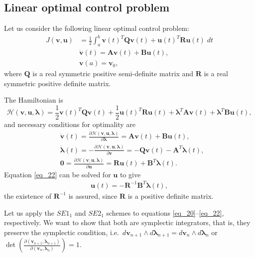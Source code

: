 \documentclass[a4paper, 10pt]{article}
\newcommand{\SEoo}{SE1_1}
\newcommand{\SEto}{SE2_1}
\begin{document}
\subsection{Linear optimal control problem}
Let us consider the following linear optimal control problem:
\begin{equation}
    \label{eq_18}
\begin{aligned}
    J(\bm{v},\bm{u}) & = \frac{1}{2} \int_{a}^b \bm{v}(t)^{T} \bm{Q} \bm{v}(t) + \bm{u}(t)^{T} \bm{R} \bm{u}(t)\; dt \\
    & \dot{\bm{v}}(t) = \bm{A} \bm{v}(t) + \bm{B}\bm{u}(t), \\
    & \bm{v}(a) = \bm{v}_{0},
\end{aligned}
\end{equation}
where $\bm{Q}$ is a real symmetric positive semi-definite matrix and $\bm{R}$ is a real symmetric positive definite matrix.

The Hamiltonian is
\begin{equation}\label{eq_19}
    \mathcal{H}(\bm{v},\bm{u},\bm{\lambda}) =  \frac{1}{2} \bm{v}(t)^{T} \bm{Q} \bm{v}(t) + \frac{1}{2} \bm{u}(t)^{T} \bm{R} \bm{u}(t) + \bm{\lambda}^{T} \bm{A}\bm{v}(t) + \bm{\lambda}^{T} \bm{B}\bm{u}(t),
\end{equation}
and necessary conditions for optimality are
\begin{align}
    & \dot{\bm{v}}(t) = \frac{\partial \mathcal{H}(\bm{v},\bm{u},\bm{\lambda})}{\partial\bm{\lambda}}  = \bm{A} \bm{v}(t) + \bm{B}\bm{u}(t), \label{eq_20} \\
    & \dot{\bm{\lambda}}(t) =  -\frac{\partial \mathcal{H}(\bm{v},\bm{u},\bm{\lambda})}{\partial \bm{v}} = -\bm{Q}\bm{v}(t) - \bm{A}^{T}\bm{\lambda}(t), \label{eq_21} \\
    & \bm{0} =  \frac{\partial \mathcal{H}(\bm{v},\bm{u},\bm{\lambda})}{\partial \bm{u}} = \bm{R}\bm{u}(t) + \bm{B}^{T}\bm{\lambda}(t). \label{eq_22}
\end{align}
Equation \eqref{eq_22} can be solved for $\bm{u}$ to give
\begin{align}
    \bm{u}(t) = -\bm{R}^{-1}\bm{B}^{T}\bm{\lambda}(t),
\end{align}
the existence of $\bm{R}^{-1}$ is assured, since $\bm{R}$ is a positive definite matrix.

Let us apply the $\SEoo$ and $\SEto$ schemes to equations \eqref{eq_20}--\eqref{eq_22}, respectively. We want to show that both are symplectic integrators, that is, they preserve the symplectic condition, i.e.\ $d\bm{v}_{n+1} \wedge d\bm{\lambda}_{n+1} = d\bm{v}_{n} \wedge d\bm{\lambda}_{n}$ or $\det\!\left(\frac{\partial(\bm{v}_{n+1},\bm{\lambda}_{n+1})}{\partial(\bm{v}_{n},\bm{\lambda}_{n})}\right) = 1.$
\end{document}
